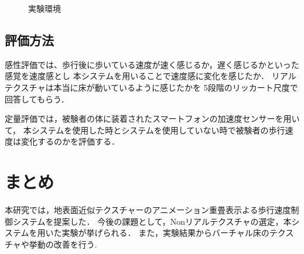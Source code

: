\documentclass[dvipdfmx]{jsarticle}
\begin{document}
\begin{figure}[t]
    \centering
    \caption{実験環境}
    \label{fig:kokaton}
\end{figure}

 \subsection{評価方法}
 感性評価では、歩行後に歩いている速度が速く感じるか，遅く感じるかといった感覚を速度感とし
 本システムを用いることで速度感に変化を感じたか．
 リアルテクスチャは本当に床が動いているように感じたかを
 5段階のリッカート尺度で回答してもらう．


 定量評価では，被験者の体に装着されたスマートフォンの加速度センサーを用いて，
 本システムを使用した時とシステムを使用していない時で被験者の歩行速度は変化するのかを評価する．

\section{まとめ}
本研究では，地表面近似テクスチャーのアニメーション重畳表示よる歩行速度制御システムを提案した．
今後の課題として，Nonリアルテクスチャの選定，本システムを用いた実験が挙げられる．
また，実験結果からバーチャル床のテクスチャや挙動の改善を行う.


\end{document}
